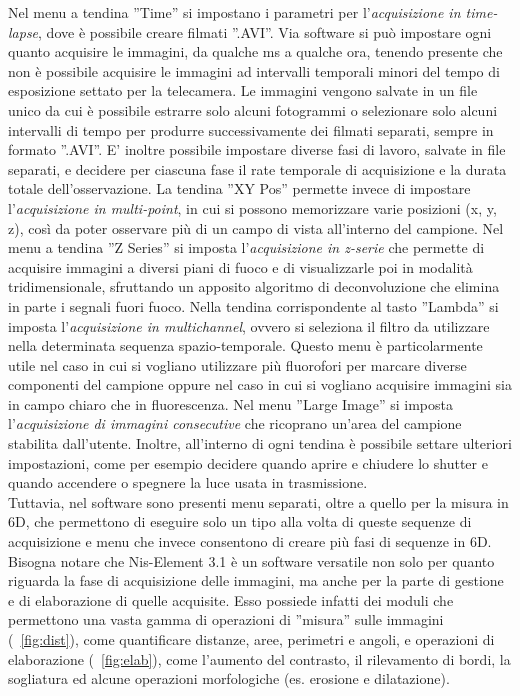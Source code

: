 Nel menu a tendina ''Time'' si impostano i parametri per l'\textit{acquisizione in time-lapse}, dove è possibile creare filmati ''.AVI''. Via software si può impostare ogni quanto acquisire le immagini, da qualche ms a qualche ora, tenendo presente che non è possibile acquisire le immagini ad intervalli temporali minori del tempo di esposizione settato per la telecamera. Le immagini vengono salvate in un file unico da cui è possibile estrarre solo alcuni fotogrammi o selezionare solo alcuni intervalli di tempo per produrre successivamente dei filmati separati, sempre in formato ''.AVI''. E' inoltre possibile impostare diverse fasi di lavoro, salvate in file separati, e decidere per ciascuna fase il rate temporale di acquisizione e la durata totale dell'osservazione. 
La tendina ''XY Pos'' permette invece di impostare l'\textit{acquisizione in multi-point}, in cui si possono memorizzare varie posizioni (x, y, z), così da poter osservare più di un campo di vista all'interno del campione. 
Nel menu a tendina ''Z Series'' si imposta l'\textit{acquisizione in z-serie} che permette di acquisire immagini a diversi piani di fuoco e di visualizzarle poi in modalità tridimensionale, sfruttando un apposito algoritmo di deconvoluzione che elimina in parte i segnali fuori fuoco. 
Nella tendina corrispondente al tasto ''Lambda'' si imposta l'\textit{acquisizione in multichannel}, ovvero si seleziona il filtro da utilizzare nella determinata sequenza spazio-temporale. Questo menu è particolarmente utile nel caso in cui si vogliano utilizzare più fluorofori per marcare diverse componenti del campione oppure nel caso in cui si vogliano acquisire immagini sia in campo chiaro che in fluorescenza. 
Nel menu ''Large Image'' si imposta l'\textit{acquisizione di immagini consecutive} che ricoprano un'area del campione stabilita dall'utente.
Inoltre, all'interno di ogni tendina è possibile settare ulteriori impostazioni, come per esempio decidere quando aprire e chiudere lo shutter e quando accendere o spegnere la luce usata in trasmissione.\\
Tuttavia, nel software sono presenti menu separati, oltre a quello per la misura in 6D, che permettono di eseguire solo un tipo alla volta di queste sequenze di acquisizione e menu che invece consentono di creare più fasi di sequenze in 6D.\\
Bisogna notare che Nis-Element 3.1 è un software versatile non solo per quanto riguarda la fase di acquisizione delle immagini, ma anche per la parte di gestione e di elaborazione di quelle acquisite. Esso possiede infatti dei moduli che permettono una vasta gamma di operazioni di ''misura'' sulle immagini (\figurename~\ref{fig:dist}), come quantificare distanze, aree, perimetri e angoli, e operazioni di elaborazione (\figurename~\ref{fig:elab}), come l'aumento del contrasto, il rilevamento di bordi, la sogliatura ed alcune operazioni morfologiche (es. erosione e dilatazione).


